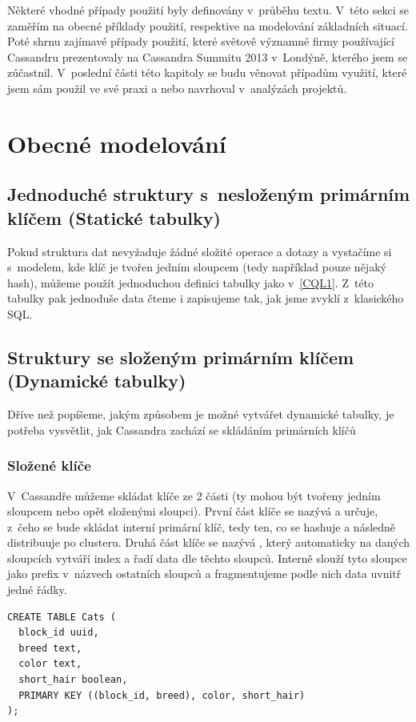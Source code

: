 Některé vhodné případy použití byly definovány v~průběhu textu. V~této sekci se zaměřím na obecné příklady použití, respektive na modelování základních situací. Poté shrnu zajímavé případy použití, které světově významné firmy používající Cassandru prezentovaly na Cassandra Summitu 2013 v~Londýně, kterého jsem se zúčastnil. V~poslední části této kapitoly se budu věnovat případům využití, které jsem sám použil ve své praxi a nebo navrhoval v~analýzách projektů. 

\section{Obecné modelování}

\subsection{Jednoduché struktury s~nesloženým primárním klíčem (Statické tabulky)}

Pokud struktura dat nevyžaduje žádné složité operace a dotazy a vystačíme si s~modelem, kde klíč je tvořen jedním sloupcem (tedy například pouze nějaký hash), můžeme použít jednoduchou definici tabulky jako v~\ref{CQL1}. Z~této tabulky pak jednoduše data čteme i zapisujeme tak, jak jsme zvyklí z~klasického SQL.

\subsection{Struktury se složeným primárním klíčem (Dynamické tabulky)}

Dříve než popíšeme, jakým způsobem je možné vytvářet dynamické tabulky, je potřeba vysvětlit, jak Cassandra zachází se skládáním primárních klíčů

\subsubsection*{Složené klíče}
V~Cassandře můžeme skládat klíče ze 2 části (ty mohou být tvořeny jedním sloupcem nebo opět složenými sloupci). První část klíče se nazývá  a určuje, z~čeho se bude skládat interní primární klíč, tedy ten, co se hashuje a následně distribuuje po clusteru. Druhá část klíče se nazývá , který automaticky na daných sloupcích vytváří index a řadí data dle těchto sloupců. Interně slouží tyto sloupce jako prefix v~názvech ostatních sloupců a fragmentujeme podle nich data uvnitř jedné řádky. 

\begin{lstlisting}[caption={Ukázka složených klíčů},label=CQL2]
CREATE TABLE Cats (
  block_id uuid,
  breed text,
  color text,
  short_hair boolean,
  PRIMARY KEY ((block_id, breed), color, short_hair)
);
\end{lstlisting}

